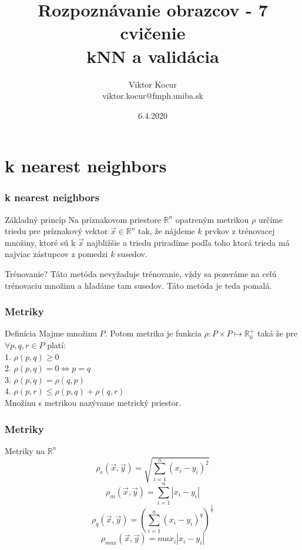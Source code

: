 \documentclass{beamer}
\title[kNN]{Rozpoznávanie obrazcov - 7 cvičenie \\ kNN a validácia}
\author[Viktor Kocur]{Viktor Kocur \\{\small viktor.kocur@fmph.uniba.sk}}
\institute{DAI FMFI UK}
\date{6.4.2020}
\begin{document}

\begin{frame}[plain]
  \titlepage  
\end{frame}

\section{k nearest neighbors}

\begin{frame}
\frametitle{k nearest neighbors}
\begin{block}{Základný princíp}
Na príznakovom priestore $\mathbb{R}^n$ opatreným metrikou $\rho$ určíme triedu pre príznakový vektor $\vec{x} \in \mathbb{R}^n$ tak, že nájdeme $k$ prvkov z trénovacej množiny, ktoré sú k $\vec{x}$ najbližšie a triedu priradíme podľa toho ktorá trieda má najviac zástupcov z pomedzi $k$ susedov.
\end{block}

\begin{block}{Trénovanie?}
Táto metóda nevyžaduje trénovanie, vždy sa pozeráme na celú trénovaciu množinu a hľadáme tam susedov. Táto metóda je teda pomalá.
\end{block}
\end{frame}


\begin{frame}
\frametitle{Metriky}
\begin{block}{Definícia}
Majme množinu $P$. Potom metrika je funkcia $\rho: P \times P \mapsto \mathbb{R}_0^+$ taká že pre $\forall p, q, r \in P$ platí: \\
1. $\rho(p,q) \ge 0$ \\
2. $\rho(p,q) = 0 \Leftrightarrow p = q$ \\
3. $\rho(p,q) = \rho(q,p)$ \\
4. $\rho(p,r) \leq \rho(p,q) + \rho(q,r)$
\vspace{1em}
\\
Množinu s metrikou nazývame metrický priestor.
\end{block}
\end{frame}


\begin{frame}
\frametitle{Metriky}
\begin{block}{Metriky na $\mathbb{R}^n$}
$$\rho_e(\vec{x}, \vec{y}) = \sqrt{\sum_{i = 1}^n (x_i - y_i)^2 }   $$
$$\rho_m(\vec{x}, \vec{y}) = \sum_{i = 1}^n |x_i - y_i |   $$
$$\rho_q(\vec{x}, \vec{y}) = \left( \sum_{i = 1}^n (x_i - y_i)^q  \right)^{\frac{1}{q}} $$
$$\rho_{max}(\vec{x}, \vec{y}) = max_{i} | x_i - y_i |  $$
\end{block}
\end{frame}
\end{document}

